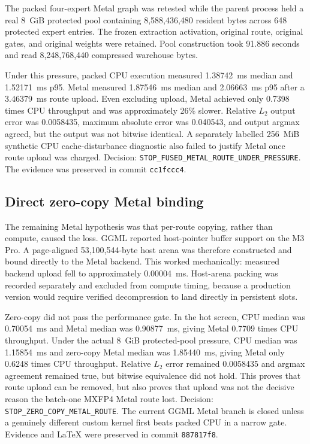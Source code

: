 The packed four-expert Metal graph was retested while the parent process held a
real 8~GiB protected pool containing 8,588,436,480 resident bytes across 648
protected expert entries.  The frozen extraction activation, original route,
original gates, and original weights were retained.  Pool construction took
91.886 seconds and read 8,248,768,440 compressed warehouse bytes.

Under this pressure, packed CPU execution measured 1.38742~ms median and
1.52171~ms p95.  Metal measured 1.87546~ms median and 2.06663~ms p95 after a
3.46379~ms route upload.  Even excluding upload, Metal achieved only 0.7398
times CPU throughput and was approximately 26\% slower.  Relative $L_2$ output
error was 0.0058435, maximum absolute error was 0.040543, and output argmax
agreed, but the output was not bitwise identical.  A separately labelled
256~MiB synthetic CPU cache-disturbance diagnostic also failed to justify Metal
once route upload was charged.  Decision:
\texttt{STOP\_FUSED\_METAL\_ROUTE\_UNDER\_PRESSURE}.  The evidence was
preserved in commit \texttt{cc1fccc4}.

\subsection{Direct zero-copy Metal binding}

The remaining Metal hypothesis was that per-route copying, rather than compute,
caused the loss.  GGML reported host-pointer buffer support on the M3 Pro.  A
page-aligned 53,100,544-byte host arena was therefore constructed and bound
directly to the Metal backend.  This worked mechanically: measured backend
upload fell to approximately 0.00004~ms.  Host-arena packing was recorded
separately and excluded from compute timing, because a production version would
require verified decompression to land directly in persistent slots.

Zero-copy did not pass the performance gate.  In the hot screen, CPU median was
0.70054~ms and Metal median was 0.90877~ms, giving Metal 0.7709 times CPU
throughput.  Under the actual 8~GiB protected-pool pressure, CPU median was
1.15854~ms and zero-copy Metal median was 1.85440~ms, giving Metal only 0.6248
times CPU throughput.  Relative $L_2$ error remained 0.0058435 and argmax
agreement remained true, but bitwise equivalence did not hold.  This proves
that route upload can be removed, but also proves that upload was not the
decisive reason the batch-one MXFP4 Metal route lost.  Decision:
\texttt{STOP\_ZERO\_COPY\_METAL\_ROUTE}.  The current GGML Metal branch is
closed unless a genuinely different custom kernel first beats packed CPU in a
narrow gate.  Evidence and LaTeX were preserved in commit \texttt{887817f8}.

